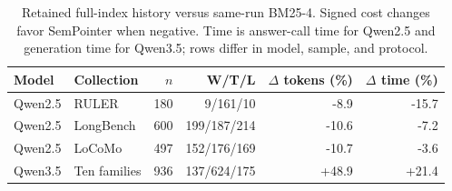 \begin{table}[H]
\centering
\footnotesize
\setlength{\tabcolsep}{4pt}
\caption{Retained full-index history versus same-run BM25-4. Signed cost changes favor SemPointer when negative. Time is answer-call time for Qwen2.5 and generation time for Qwen3.5; rows differ in model, sample, and protocol.}
\label{tab:sub-history}
\begin{tabular}{llrrrr}
\toprule
Model & Collection & $n$ & W/T/L & $\Delta$ tokens (\%) & $\Delta$ time (\%) \\
\midrule
Qwen2.5 & RULER & 180 & 9/161/10 & -8.9 & -15.7 \\
Qwen2.5 & LongBench & 600 & 199/187/214 & -10.6 & -7.2 \\
Qwen2.5 & LoCoMo & 497 & 152/176/169 & -10.7 & -3.6 \\
Qwen3.5 & Ten families & 936 & 137/624/175 & +48.9 & +21.4 \\
\bottomrule
\end{tabular}
\end{table}
